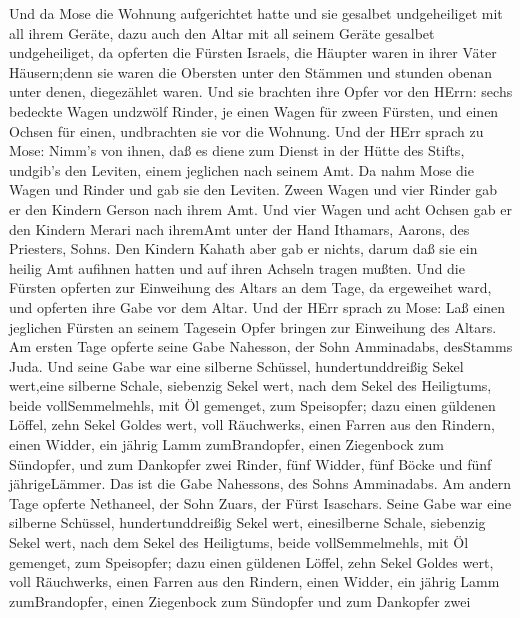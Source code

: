  Und da Mose die Wohnung aufgerichtet hatte und sie gesalbet
undgeheiliget mit all ihrem Geräte, dazu auch den Altar mit all seinem
Geräte gesalbet undgeheiliget,  da opferten die Fürsten
Israels, die Häupter waren in ihrer Väter Häusern;denn sie waren die
Obersten unter den Stämmen und stunden obenan unter denen, diegezählet
waren.  Und sie brachten ihre Opfer vor den HErrn: sechs
bedeckte Wagen undzwölf Rinder, je einen Wagen für zween Fürsten, und
einen Ochsen für einen, undbrachten sie vor die Wohnung. 
Und der HErr sprach zu Mose:  Nimm's von ihnen, daß es diene
zum Dienst in der Hütte des Stifts, undgib's den Leviten, einem
jeglichen nach seinem Amt.  Da nahm Mose die Wagen und
Rinder und gab sie den Leviten.  Zween Wagen und vier Rinder
gab er den Kindern Gerson nach ihrem Amt.  Und vier Wagen
und acht Ochsen gab er den Kindern Merari nach ihremAmt unter der Hand
Ithamars, Aarons, des Priesters, Sohns.  Den Kindern Kahath
aber gab er nichts, darum daß sie ein heilig Amt aufihnen hatten und auf
ihren Achseln tragen mußten.  Und die Fürsten opferten zur
Einweihung des Altars an dem Tage, da ergeweihet ward, und opferten ihre
Gabe vor dem Altar.  Und der HErr sprach zu Mose: Laß einen
jeglichen Fürsten an seinem Tagesein Opfer bringen zur Einweihung des
Altars.  Am ersten Tage opferte seine Gabe Nahesson, der
Sohn Amminadabs, desStamms Juda.  Und seine Gabe war eine
silberne Schüssel, hundertunddreißig Sekel wert,eine silberne Schale,
siebenzig Sekel wert, nach dem Sekel des Heiligtums, beide
vollSemmelmehls, mit Öl gemenget, zum Speisopfer;  dazu
einen güldenen Löffel, zehn Sekel Goldes wert, voll Räuchwerks,
 einen Farren aus den Rindern, einen Widder, ein jährig
Lamm zumBrandopfer,  einen Ziegenbock zum Sündopfer,
 und zum Dankopfer zwei Rinder, fünf Widder, fünf Böcke und
fünf jährigeLämmer. Das ist die Gabe Nahessons, des Sohns Amminadabs.
 Am andern Tage opferte Nethaneel, der Sohn Zuars, der
Fürst Isaschars.  Seine Gabe war eine silberne Schüssel,
hundertunddreißig Sekel wert, einesilberne Schale, siebenzig Sekel wert,
nach dem Sekel des Heiligtums, beide vollSemmelmehls, mit Öl gemenget,
zum Speisopfer;  dazu einen güldenen Löffel, zehn Sekel
Goldes wert, voll Räuchwerks,  einen Farren aus den
Rindern, einen Widder, ein jährig Lamm zumBrandopfer, 
einen Ziegenbock zum Sündopfer  und zum Dankopfer zwei
